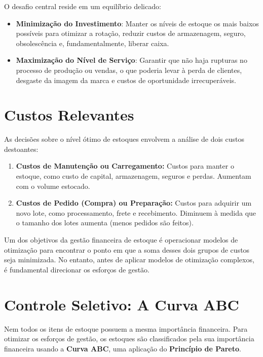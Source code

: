 \documentclass[
  a4paper,
]{book}
\providecommand{\tightlist}{%
  \setlength{\itemsep}{0pt}\setlength{\parskip}{0pt}}\usepackage{longtable,booktabs,array}
\begin{document}
O desafio central reside em um equilíbrio delicado:

\begin{itemize}
\item
  \textbf{Minimização do Investimento}: Manter os níveis de estoque os
  mais baixos possíveis para otimizar a rotação, reduzir custos de
  armazenagem, seguro, obsolescência e, fundamentalmente, liberar caixa.
\item
  \textbf{Maximização do Nível de Serviço}: Garantir que não haja
  rupturas no processo de produção ou vendas, o que poderia levar à
  perda de clientes, desgaste da imagem da marca e custos de
  oportunidade irrecuperáveis.
\end{itemize}

\section{Custos Relevantes}\label{custos-relevantes}

As decisões sobre o nível ótimo de estoques envolvem a análise de dois
custos destoantes:

\begin{enumerate}
\def\labelenumi{\arabic{enumi}.}
\tightlist
\item
  \textbf{Custos de Manutenção ou Carregamento:} Custos para manter o
  estoque, como custo de capital, armazenagem, seguros e perdas.
  Aumentam com o volume estocado.
\item
  \textbf{Custos de Pedido (Compra) ou Preparação:} Custos para adquirir
  um novo lote, como processamento, frete e recebimento. Diminuem à
  medida que o tamanho dos lotes aumenta (menos pedidos são feitos).
\end{enumerate}

Um dos objetivos da gestão financeira de estoque é operacionar modelos
de otimização para encontrar o ponto em que a soma desses dois grupos de
custos seja minimizada. No entanto, antes de aplicar modelos de
otimização complexos, é fundamental direcionar os esforços de gestão.

\section{Controle Seletivo: A Curva
ABC}\label{controle-seletivo-a-curva-abc}

Nem todos os itens de estoque possuem a mesma importância financeira.
Para otimizar os esforços de gestão, os estoques são classificados pela
sua importância financeira usando a \textbf{Curva ABC}, uma aplicação do
\textbf{Princípio de Pareto}.
\end{document}
